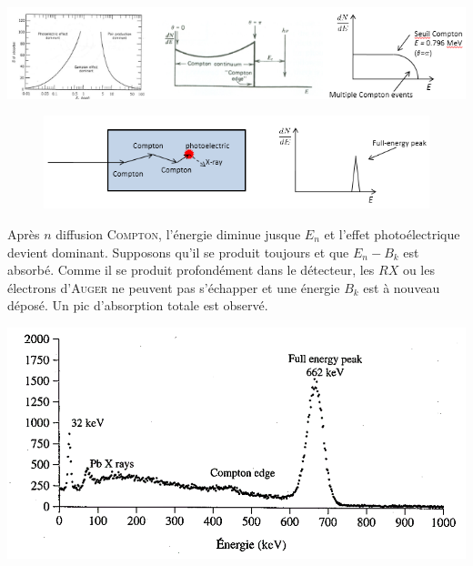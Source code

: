 \begin{center}
	\includegraphics[scale=0.75]{ch10/image7}
\end{center}


	\begin{figure}
	\vspace{-5mm}
	\includegraphics[scale=0.4]{ch10/image8}
	\end{figure}
Après $n$ diffusion \textsc{Compton}, l'énergie diminue jusque $E_n$ et l'effet photoélectrique
devient dominant. Supposons qu'il se produit toujours et que $E_n-B_k$ est absorbé. Comme il 
se produit profondément dans le détecteur, les $RX$ ou les électrons d'\textsc{Auger} ne peuvent
pas s'échapper et une énergie $B_k$ est à nouveau déposé. Un pic d'absorption totale est observé.



\begin{center}
	\includegraphics[scale=0.4]{ch10/image9}
\end{center}



